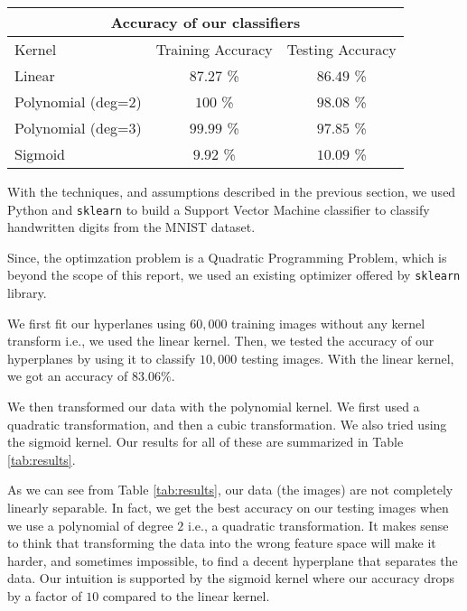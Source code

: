 \begin{table*}[!tb]
	\centering
	\begin{tabular}{lcc}
		\toprule
		\multicolumn{3}{c}{\textbf{Accuracy of our classifiers}} \\
		\midrule
		Kernel & Training Accuracy & Testing Accuracy \\
		\midrule
		Linear & $87.27$ \% & $86.49$ \% \\
		Polynomial (deg=$2$) & $100$ \% & $98.08$ \% \\
		Polynomial (deg=$3$) & $99.99$ \% & $97.85$ \% \\
		Sigmoid & $9.92$ \% & $10.09$ \% \\
		\bottomrule
	\end{tabular}
	\caption{Accuracy of different classifiers}
	\label{tab:results}
\end{table*}

With the techniques, and assumptions described in the previous section, we used Python and \texttt{sklearn}\cite{scikit-learn} to build a Support Vector Machine classifier to classify handwritten digits from the MNIST dataset.

Since, the optimzation problem is a Quadratic Programming Problem, which is beyond the scope of this report, we used an existing optimizer offered by \texttt{sklearn} library.

We first fit our hyperlanes using $60,000$ training images without any kernel transform i.e., we used the linear kernel. Then, we tested the accuracy of our hyperplanes by using it to classify $10,000$ testing images. With the linear kernel, we got an accuracy of $83.06 \%$.

We then transformed our data with the polynomial kernel. We first used a quadratic transformation, and then a cubic transformation. We also tried using the sigmoid kernel. Our results for all of these are summarized in Table \ref{tab:results}.

As we can see from Table \ref{tab:results}, our data (the images) are not completely linearly separable. In fact, we get the best accuracy on our testing images when we use a polynomial of degree $2$ i.e., a quadratic transformation. It makes sense to think that transforming the data into the wrong feature space will make it harder, and sometimes impossible, to find a decent hyperplane that separates the data. Our intuition is supported by the sigmoid kernel where our accuracy drops by a factor of $10$ compared to the linear kernel.
